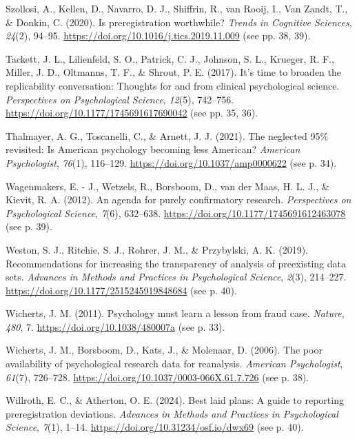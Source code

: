 \documentclass[authordate, empirical,issue]{jote-new-article}
\begin{document}
Szollosi, A., Kellen, D., Navarro, D. J., Shiffrin, R., van Rooij, I., Van Zandt, T., \& Donkin, C. (2020). Is preregistration worthwhile? \emph{Trends in Cognitive Sciences}, \emph{24}(2), 94–95. \url{https://doi.org/10.1016/j.tics.2019.11.009} (see pp. 38, 39).

Tackett, J. L., Lilienfeld, S. O., Patrick, C. J., Johnson, S. L., Krueger, R. F., Miller, J. D., Oltmanns, T. F., \& Shrout, P. E. (2017). It’s time to broaden the replicability conversation: Thoughts for and from clinical psychological science. \emph{Perspectives on Psychological Science}, \emph{12}(5), 742–756. \url{https://doi.org/10.1177/1745691617690042} (see pp. 35, 36).

Thalmayer, A. G., Toscanelli, C., \& Arnett, J. J. (2021). The neglected 95\% revisited: Is American psychology becoming less American? \emph{American Psychologist}, \emph{76}(1), 116–129. \url{https://doi.org/10.1037/amp0000622} (see p. 34).

Wagenmakers, E. - J., Wetzels, R., Borsboom, D., van der Maas, H. L. J., \& Kievit, R. A. (2012). An agenda for purely confirmatory research. \emph{Perspectives on Psychological Science}, \emph{7}(6), 632–638. \url{https://doi.org/10.1177/1745691612463078} (see p. 39).

Weston, S. J., Ritchie, S. J., Rohrer, J. M., \& Przybylski, A. K. (2019). Recommendations for increasing the transparency of analysis of preexisting data sets. \emph{Advances in Methods and Practices in Psychological Science}, \emph{2}(3), 214–227. \url{https://doi.org/10.1177/2515245919848684} (see p. 40).

Wicherts, J. M. (2011). Psychology must learn a lesson from fraud case. \emph{Nature}, \emph{480}, 7. \url{https://doi.org/10.1038/480007a} (see p. 33).

Wicherts, J. M., Borsboom, D., Kats, J., \& Molenaar, D. (2006). The poor availability of psychological research data for reanalysis. \emph{American Psychologist}, \emph{61}(7), 726–728. \url{https://doi.org/10.1037/0003-066X.61.7.726} (see p. 38).

Willroth, E. C., \& Atherton, O. E. (2024). Best laid plans: A guide to reporting preregistration deviations. \emph{Advances in Methods and Practices in Psychological Science}, \emph{7}(1), 1–14. \url{https://doi.org/10.31234/osf.io/dwx69} (see p. 40).
\end{document}
